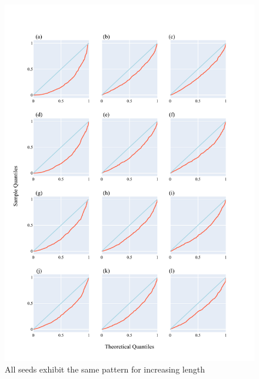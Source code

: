 \begin{figure}[!ht]
\centering
\includegraphics[width=\textwidth]{figures/plots/synthetic/lrt/all-seeds.pdf}
\caption{All seeds exhibit the same pattern for increasing length}
\label{fig:synthetic/lrt/all-seeds}
\end{figure}